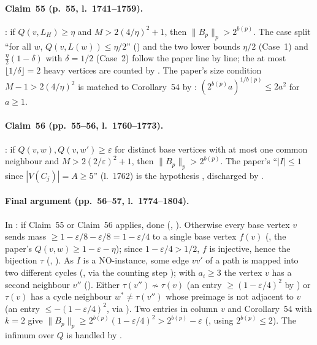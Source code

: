 \paragraph{Claim~55 (p.~55, l.~1741--1759).} : if $Q(v,L_H)\ge\eta$ and
$M>2(4/\eta)^2+1$, then $\|B_p\|_p>2^{b(p)}$. The case split ``for all $w$, $Q(v,L(w))\le\eta/2$''
() and the two lower bounds $\eta/2$ (Case~1) and $\frac\eta2(1-\delta)$ with $\delta=1/2$ (Case~2)
follow the paper line by line; the at most $\lfloor1/\delta\rfloor=2$ heavy vertices are counted by
. The paper's size condition $M-1>2(4/\eta)^2$ is matched to Corollary~54 by
: $(2^{b(p)}a)^{1/b(p)}\le2a^2$ for $a\ge1$.

\paragraph{Claim~56 (pp.~55--56, l.~1760--1773).} : if $Q(v,w),Q(v,w')\ge\varepsilon$ for distinct
base vertices with at most one common neighbour and $M>2(2/\varepsilon)^2+1$, then $\|B_p\|_p>2^{b(p)}$.
The paper's ``$|I|\le1$ since $|V(C_j)|=A\ge5$'' (l.~1762) is the hypothesis , discharged by
.

\paragraph{Final argument (pp.~56--57, l.~1774--1804).} In : if Claim~55 or
Claim~56 applies, done (, ). Otherwise every base vertex $v$ sends mass
$\ge1-\varepsilon/8-\varepsilon/8=1-\varepsilon/4$ to a single base vertex $f(v)$ (, the paper's
$Q(v,w)\ge1-\varepsilon-\eta$); since $1-\varepsilon/4>1/2$, $f$ is injective, hence the bijection $\tau$
(, ). As $I$ is a NO-instance, some edge $vv'$ of a path is mapped into
two different cycles (, via the counting step ); with $a_i\ge3$ the vertex
$v$ has a second neighbour $v''$ (). Either $\tau(v'')\not\sim\tau(v)$ (an entry
$\ge(1-\varepsilon/4)^2$ by ) or $\tau(v)$ has a cycle neighbour $w^*\ne\tau(v'')$ whose
preimage is not adjacent to $v$ (an entry $\le-(1-\varepsilon/4)^2$, via ). Two
entries in column $v$ and Corollary~54 with $k=2$ give $\|B_p\|_p\ge2^{b(p)}(1-\varepsilon/4)^2>2^{b(p)}-\varepsilon$
(, using $2^{b(p)}\le2$). The infimum over $Q$ is handled by .

